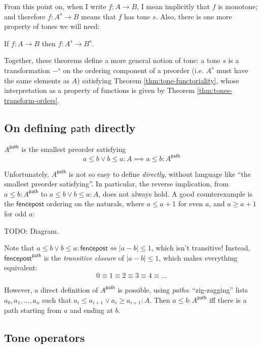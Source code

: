 \documentclass[acmsmall, screen, dvipsnames]{acmart}
\newcommand{\todo}[1]{{\color{red}#1}}
\newcommand{\ms}[1]{\ensuremath{\mathsf{#1}}}
\renewcommand{\path}{\ms{path}}
\begin{document}
From this point on, when I write $f : A \to B$, I mean implicitly that $f$ is
monotone; and therefore $f : A^s \to B$ means that $f$ has tone $s$.
%
Also, there is one more property of tones we will need:

\begin{theorem}\label{thm:tone-functoriality}
  If $f : A \to B$ then $f : A^s \to B^s$.
\end{theorem}

Together, these theorems define a more general notion of tone: a tone $s$ is a
transformation $-^s$ on the ordering component of a preorder (i.e. $A^s$ must
have the same elements as $A$) satisfying Theorem \ref{thm:tone-functoriality},
whose interpretation as a property of functions is given by Theorem
\ref{thm:tones-transform-orders}.

\subsection{On defining \ms{path} directly} \label{sec:defining-path}

$A^\path$ is the smallest preorder satisfying
\[ a \le b \vee b \le a : A \implies a \le b : A^\path \]

Unfortunately, $A^\path$ is not so easy to define \emph{directly}, without
language like ``the smallest preorder satisfying''.
%
In particular, the reverse implication, from $a \le b : A^\path$ to $a \le b
\vee b \le a : A$, does not always hold. A good counterexample is the
\ms{fencepost} ordering on the naturals, where $a \le a+1$ for even $a$, and $a
\ge a+1$ for odd $a$:

\todo{TODO: Diagram}.

Note that $a \le b \vee b \le a : \ms{fencepost} \iff |a-b| \le 1$, which isn't
transitive! Instead, $\ms{fencepost}^\path$ is the \emph{transitive closure} of
$|a - b| \le 1$, which makes everything equivalent:
\[ 0 \equiv 1 \equiv 2 \equiv 3 \equiv 4 \equiv ... \]

However, a direct definition of $A^\path$ is possible, using \emph{paths}:
``zig-zagging'' lists $a_0, a_1, ..., a_n$ such that $a_i \le a_{i+1} \vee a_i
\ge a_{i+1} : A$. Then $a \le b : A^\path$ iff there is a path starting from $a$
and ending at $b$.


\subsection{Tone operators}
\end{document}
